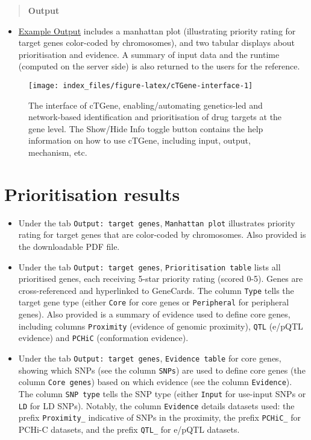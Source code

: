 \documentclass[
  oneside]{book}
\providecommand{\tightlist}{%
  \setlength{\itemsep}{0pt}\setlength{\parskip}{0pt}}
\begin{document}
\begin{quote}
\textbf{Output}
\end{quote}

\begin{itemize}
\tightlist
\item
  \href{http://www.genetictargets.com/app/examples/_tmp_RMD_cTGene.html}{Example Output} includes a manhattan plot (illustrating priority rating for target genes color-coded by chromosomes), and two tabular displays about prioritisation and evidence. A summary of input data and the runtime (computed on the server side) is also returned to the users for the reference.
\end{itemize}

\begin{figure}

{\centering \texttt{[image: index\_files/figure-latex/cTGene-interface-1]} 

}

\caption{The interface of cTGene, enabling/automating genetics-led and network-based identification and prioritisation of drug targets at the gene level. The Show/Hide Info toggle button contains the help information on how to use cTGene, including input, output, mechanism, etc.}\label{fig:cTGene-interface}
\end{figure}

\hypertarget{prioritisation-results}{%
\section{Prioritisation results}\label{prioritisation-results}}

\begin{itemize}
\item
  Under the tab \texttt{Output:\ target\ genes}, \texttt{Manhattan\ plot} illustrates priority rating for target genes that are color-coded by chromosomes. Also provided is the downloadable PDF file.
\item
  Under the tab \texttt{Output:\ target\ genes}, \texttt{Prioritisation\ table} lists all prioritised genes, each receiving 5-star priority rating (scored 0-5). Genes are cross-referenced and hyperlinked to GeneCards. The column \texttt{Type} tells the target gene type (either \texttt{Core} for core genes or \texttt{Peripheral} for peripheral genes). Also provided is a summary of evidence used to define core genes, including columns \texttt{Proximity} (evidence of genomic proximity), \texttt{QTL} (e/pQTL evidence) and \texttt{PCHiC} (conformation evidence).
\item
  Under the tab \texttt{Output:\ target\ genes}, \texttt{Evidence\ table} for core genes, showing which SNPs (see the column \texttt{SNPs}) are used to define core genes (the column \texttt{Core\ genes}) based on which evidence (see the column \texttt{Evidence}). The column \texttt{SNP\ type} tells the SNP type (either \texttt{Input} for use-input SNPs or \texttt{LD} for LD SNPs). Notably, the column \texttt{Evidence} details datasets used: the prefix \texttt{Proximity\_} indicative of SNPs in the proximity, the prefix \texttt{PCHiC\_} for PCHi-C datasets, and the prefix \texttt{QTL\_} for e/pQTL datasets.
\end{itemize}
\end{document}
